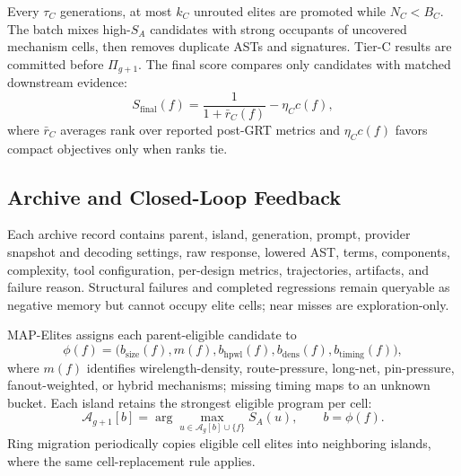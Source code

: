 Every $\tau_C$ generations, at most $k_C$ unrouted elites are promoted while
$N_C<B_C$. The batch mixes high-$S_A$ candidates with strong occupants of
uncovered mechanism cells, then removes duplicate ASTs and signatures. Tier-C
results are committed before $\Pi_{g+1}$. The final score compares only
candidates with matched downstream evidence:
\begin{equation}
S_{\mathrm{final}}(f)=
\frac{1}{1+\bar r_C(f)}-\eta_Cc(f),
\label{eq:final-score}
\end{equation}
where $\bar r_C$ averages rank over reported post-GRT metrics and $\eta_Cc(f)$
favors compact objectives only when ranks tie.

\subsection{Archive and Closed-Loop Feedback}
\label{sec:archive}
\label{sec:search}

Each archive record contains parent, island, generation, prompt, provider
snapshot and decoding settings, raw response, lowered AST, terms, components,
complexity, tool configuration, per-design metrics, trajectories, artifacts,
and failure reason. Structural failures and completed regressions remain
queryable as negative memory but cannot occupy elite cells; near misses are
exploration-only.

MAP-Elites assigns each parent-eligible candidate to
\begin{equation}
\phi(f)=\bigl(b_{\mathrm{size}}(f),m(f),b_{\mathrm{hpwl}}(f),
b_{\mathrm{dens}}(f),b_{\mathrm{timing}}(f)\bigr),
\label{eq:archive-key}
\end{equation}
where $m(f)$ identifies wirelength-density, route-pressure, long-net,
pin-pressure, fanout-weighted, or hybrid mechanisms; missing timing maps to an
unknown bucket. Each island retains the strongest eligible program per cell:
\begin{equation}
\mathcal{A}_{g+1}[b]=
\arg\max_{u\in\mathcal{A}_g[b]\cup\{f\}}S_A(u),
\qquad b=\phi(f).
\label{eq:archive-update}
\end{equation}
Ring migration periodically copies eligible cell elites into neighboring
islands, where the same cell-replacement rule applies.

